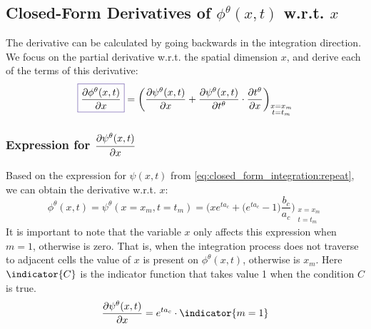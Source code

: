 \subsection{Closed-Form Derivatives of $\phi^\theta(x,t)$ w.r.t. $x$}\label{sec:closed_form_derivative_x}

The derivative can be calculated by going backwards in the integration direction. We focus on the partial derivative w.r.t. the spatial dimension $x$, and derive each of the terms of this derivative:
\begin{equation}
\color{Violet}\boxed{\color{black}\frac{\partial \phi^\theta(x,t)}{\partial x}}\color{black} = 
\bigg(
\frac{\partial \psi^\theta(x,t)}{\partial x} + 
\frac{\partial \psi^\theta(x,t)}{\partial t^\theta} \cdot
\frac{\partial t^\theta}{\partial x}
\bigg)_{\substack{x = x_m \\ t = t_m}}
\end{equation}


\subsubsection{Expression for $\cfrac{\partial \psi^\theta(x,t)}{\partial x}$}

Based on the expression for $\psi(x,t)$ from \cref{eq:closed_form_integration:repeat}, 
we can obtain the derivative w.r.t. $x$:
\begin{equation}
\phi^\theta(x,t) = \psi^\theta(x=x_m,t=t_m) = 
  \bigg(
      x e^{t a_c} + \Big(e^{t a_c}-1\Big) \frac{b_c}{a_c}
  \bigg)_{\substack{x = x_m \\ t = t_m}}
\end{equation}
It is important to note that the variable $x$ only affects this expression when $m=1$, otherwise is zero. That is, when the integration process does not traverse to adjacent cells 
the value of $x$ is present on $\phi^\theta(x,t)$, otherwise is $x_m$. Here $\indicator{C}$ is the indicator function that takes value 1 when the condition $C$ is true.
\begin{equation}
  \frac{\partial \psi^\theta(x,t)}{\partial x} = %
  e^{t a_c} \cdot \indicator{m=1} %
\end{equation}


